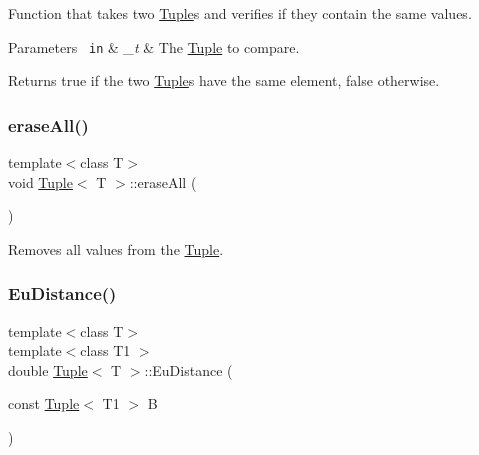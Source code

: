 Function that takes two {\ttfamily \mbox{\hyperlink{class_tuple}{Tuple}}}s and verifies if they contain the same values. 


\begin{DoxyParams}[1]{Parameters}
\mbox{\texttt{ in}}  & {\em \+\_\+t} & The {\ttfamily \mbox{\hyperlink{class_tuple}{Tuple}}} to compare.\\
\hline
\end{DoxyParams}
\begin{DoxyReturn}{Returns}
{\ttfamily true} if the two {\ttfamily \mbox{\hyperlink{class_tuple}{Tuple}}}s have the same element, {\ttfamily false} otherwise. 
\end{DoxyReturn}
\mbox{\label{class_tuple_ae36c533bd6e97ac45a2ed69a0c4760e4}} 
\subsubsection{\texorpdfstring{eraseAll()}{eraseAll()}}
{\footnotesize\ttfamily template$<$class T$>$ \\
void \mbox{\hyperlink{class_tuple}{Tuple}}$<$ T $>$\+::erase\+All (\begin{DoxyParamCaption}{ }\end{DoxyParamCaption})\hspace{0.3cm}{\ttfamily [inline]}}



Removes all values from the {\ttfamily \mbox{\hyperlink{class_tuple}{Tuple}}}. 

\mbox{\label{class_tuple_a973d6cae203bca0c1ce0d0b65279e433}} 
\subsubsection{\texorpdfstring{EuDistance()}{EuDistance()}}
{\footnotesize\ttfamily template$<$class T$>$ \\
template$<$class T1 $>$ \\
double \mbox{\hyperlink{class_tuple}{Tuple}}$<$ T $>$\+::Eu\+Distance (\begin{DoxyParamCaption}\item[{const \mbox{\hyperlink{class_tuple}{Tuple}}$<$ T1 $>$}]{B }\end{DoxyParamCaption})\hspace{0.3cm}{\ttfamily [inline]}}



